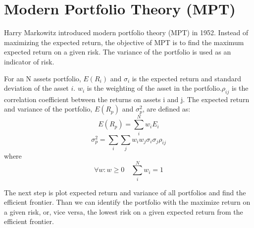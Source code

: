 \section{Modern Portfolio Theory (MPT)}
Harry Markowitz introduced modern portfolio theory (MPT) in 1952. Instead of maximizing the expected return, the objective of MPT is to find the maximum expected return on a given risk. The variance of the portfolio is used as an indicator of risk. \cite{10.2307/2975974}
\par
For an N assets portfolio, \(E(R_i)\) and  \(\sigma_i\) is the expected return and standard deviation of the asset \(i\). \(w_i\) is the weighting of the asset in the portfolio.\(\rho_{ij}\) is the correlation coefficient between the returns on assets i and j.
The expected return and variance of the portfolio, \(E(R_p)\) and \(\sigma_p^2\), are defined as:
\[ E(R_p) = \sum_i^N w_i E_i \]
\[\sigma_p^2 = \sum_i \sum_j w_i w_j \sigma_i \sigma_j \rho_{ij}\]
where
\[\forall w: w \geq 0 \quad \sum_i ^N w_i = 1\]
\par
The next step is plot expected return and variance of all portfolios and find the efficient frontier. Than we can identify the portfolio with the maximize return on a given risk, or, vice versa, the lowest risk on a given expected return from the efficient frontier.